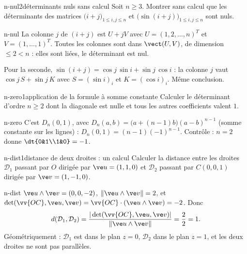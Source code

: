 \begin{exo}{n-nul}{2}{déterminants nuls sans calcul}
Soit $n\geq3$. Montrer sans calcul que les déterminants des matrices $\big(i+j\big)_{1\leq i,j\leq n}$ et $\big(\sin(i+j)\big)_{1\leq i,j\leq n}$ sont nuls.
\end{exo}

\begin{corrige}{n-nul}
La colonne $j$ de $(i+j)$ est $U+jV$ avec $U=(1,2,\dots,n)^T$ et $V=(1,\dots,1)^T$. Toutes les colonnes sont dans $\vect(U,V)$, de dimension $\leq2<n$ : elles sont liées, le déterminant est nul.

Pour la seconde, $\sin(i+j)=\cos j\,\sin i+\sin j\,\cos i$ : la colonne $j$ vaut $\cos j\,S+\sin j\,K$ avec $S=(\sin i)_i$ et $K=(\cos i)_i$. Même conclusion.
\end{corrige}

\begin{exo}{n-zero}{1}{application de la formule à somme constante}
Calculer le déterminant d'ordre $n\geq2$ dont la diagonale est nulle et tous les autres coefficients valent $1$.
\end{exo}

\begin{corrige}{n-zero}
C'est $D_n(0,1)$, avec $D_n(a,b)=\big(a+(n-1)b\big)(a-b)^{n-1}$ (somme constante sur les lignes) : $D_n(0,1)=(n-1)(-1)^{n-1}$. Contrôle : $n=2$ donne $\dt{0&1\\1&0}=-1$.
\end{corrige}

\begin{exo}{n-dist}{1}{distance de deux droites : un calcul}
Calculer la distance entre les droites $\mathcal D_1$ passant par $O$ dirigée par $\ve u=(1,1,0)$ et $\mathcal D_2$ passant par $C(0,0,1)$ dirigée par $\ve v=(1,-1,0)$.
\end{exo}

\begin{corrige}{n-dist}
$\ve u\wedge\ve v=(0,0,-2)$, $\|\ve u\wedge\ve v\|=2$, et $\det(\vv{OC},\ve u,\ve v)=\vv{OC}\cdot(\ve u\wedge\ve v)=-2$. Donc
\[d(\mathcal D_1,\mathcal D_2)=\frac{|\det(\vv{OC},\ve u,\ve v)|}{\|\ve u\wedge\ve v\|}=\frac22=1.\]
Géométriquement : $\mathcal D_1$ est dans le plan $z=0$, $\mathcal D_2$ dans le plan $z=1$, et les deux droites ne sont pas parallèles.
\end{corrige}

